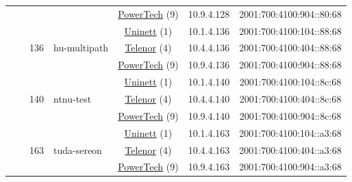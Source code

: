 \begin{small}
\begin{center}
\begin{longtable}{|c|c|c|c|c|c|c|c|}
  &  &  &  & \multicolumn{2}{|c|}{\tiny{\href{http://www.powertech.no}{PowerTech} (9)}} & \tiny{10.9.4.128} & \tiny{2001:700:4100:904::80:68} \\* \cline{3-3}\cline{4-4}\cline{5-5}\cline{6-6}\cline{7-7}\cline{8-8}
  &  & \multirow{3}{*}{\tiny{136}} & \multicolumn{1}{|l|}{\multirow{3}{*}{\tiny{hu-multipath}}} & \multicolumn{2}{|c|}{\tiny{\href{https://www.uninett.no}{Uninett} (1)}} & \tiny{10.1.4.136} & \tiny{2001:700:4100:104::88:68} \\* \cline{5-5}\cline{6-6}\cline{7-7}\cline{8-8}
  &  &  &  & \multicolumn{2}{|c|}{\tiny{\href{https://www.telenor.no}{Telenor} (4)}} & \tiny{10.4.4.136} & \tiny{2001:700:4100:404::88:68} \\* \cline{5-5}\cline{6-6}\cline{7-7}\cline{8-8}
  &  &  &  & \multicolumn{2}{|c|}{\tiny{\href{http://www.powertech.no}{PowerTech} (9)}} & \tiny{10.9.4.136} & \tiny{2001:700:4100:904::88:68} \\* \cline{3-3}\cline{4-4}\cline{5-5}\cline{6-6}\cline{7-7}\cline{8-8}
  &  & \multirow{3}{*}{\tiny{140}} & \multicolumn{1}{|l|}{\multirow{3}{*}{\tiny{ntnu-test}}} & \multicolumn{2}{|c|}{\tiny{\href{https://www.uninett.no}{Uninett} (1)}} & \tiny{10.1.4.140} & \tiny{2001:700:4100:104::8c:68} \\* \cline{5-5}\cline{6-6}\cline{7-7}\cline{8-8}
  &  &  &  & \multicolumn{2}{|c|}{\tiny{\href{https://www.telenor.no}{Telenor} (4)}} & \tiny{10.4.4.140} & \tiny{2001:700:4100:404::8c:68} \\* \cline{5-5}\cline{6-6}\cline{7-7}\cline{8-8}
  &  &  &  & \multicolumn{2}{|c|}{\tiny{\href{http://www.powertech.no}{PowerTech} (9)}} & \tiny{10.9.4.140} & \tiny{2001:700:4100:904::8c:68} \\* \cline{3-3}\cline{4-4}\cline{5-5}\cline{6-6}\cline{7-7}\cline{8-8}
  &  & \multirow{3}{*}{\tiny{163}} & \multicolumn{1}{|l|}{\multirow{3}{*}{\tiny{tuda-sereon}}} & \multicolumn{2}{|c|}{\tiny{\href{https://www.uninett.no}{Uninett} (1)}} & \tiny{10.1.4.163} & \tiny{2001:700:4100:104::a3:68} \\* \cline{5-5}\cline{6-6}\cline{7-7}\cline{8-8}
  &  &  &  & \multicolumn{2}{|c|}{\tiny{\href{https://www.telenor.no}{Telenor} (4)}} & \tiny{10.4.4.163} & \tiny{2001:700:4100:404::a3:68} \\* \cline{5-5}\cline{6-6}\cline{7-7}\cline{8-8}
  &  &  &  & \multicolumn{2}{|c|}{\tiny{\href{http://www.powertech.no}{PowerTech} (9)}} & \tiny{10.9.4.163} & \tiny{2001:700:4100:904::a3:68} \\* \cline{3-3}\cline{4-4}\cline{5-5}\cline{6-6}\cline{7-7}\cline{8-8}

\end{longtable}
\end{center}
\end{small}
